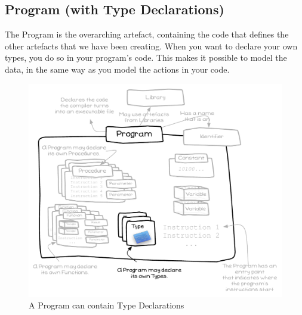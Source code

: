 \clearpage
\subsection{Program (with Type Declarations)} %
\label{sub:program_with_type_declarations_}

The Program is the overarching artefact, containing the code that defines the other artefacts that we have been creating. When you want to declare your own types, you do so in your program's code. This makes it possible to model the data, in the same way as you model the actions in your code.

\begin{figure}[h]
   \centering
   \includegraphics[width=\textwidth]{./topics/type-decl/diagrams/ProgramWithTypes} 
   \caption{A Program can contain Type Declarations}
   \label{fig:type-decl-program}
\end{figure}


